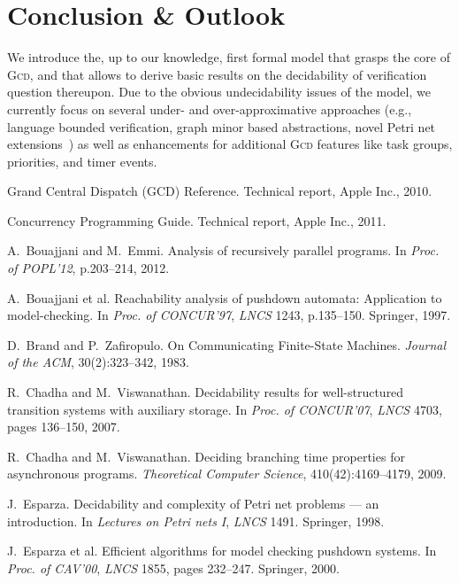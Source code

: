 \documentclass[runningheads,oribibl,]{article}
\renewcommand{\gcd}{\textsc{Gcd}\xspace}
\begin{document}
\section{Conclusion \& Outlook}
We introduce the, up to our knowledge, first formal model that grasps
the core of \gcd, and that allows to derive basic results on the
decidability of verification question thereupon. Due to the obvious
undecidability issues of the model, we currently focus on several
under- and over-approximative approaches (e.g., language bounded
verification, graph minor based abstractions, novel Petri net
extensions~\cite{geeraerts-g-2012--a}) as well as enhancements for
additional \gcd features like task groups, priorities, and timer
events.


\newcommand{\nb}{}
\begin{thebibliography}{10}

{G}rand {C}entral {D}ispatch ({GCD}) {R}eference.
\nb Technical report, Apple Inc., 2010.

{C}oncurrency {P}rogramming {G}uide.
\nb Technical report, Apple Inc., 2011.

A.~Bouajjani and M.~Emmi.
\nb Analysis of recursively parallel programs.
\nb In {\em Proc. of POPL'12}, p.203--214, 2012.

A.~Bouajjani et al.
\nb Reachability analysis of pushdown automata: Application to
  model-checking.
\nb In {\em Proc. of CONCUR'97}, {\em {LNCS}} 1243, p.135--150. Springer,
  1997.

D.~Brand and P.~Zafiropulo.
\nb {O}n {C}ommunicating {F}inite-{S}tate {M}achines.
\nb {\em Journal of the ACM}, 30(2):323--342, 1983.

R.~Chadha and M.~Viswanathan.
\nb Decidability results for well-structured transition systems with
  auxiliary storage.
\nb In {\em Proc. of CONCUR'07}, {\em {LNCS}} 4703, pages
  136--150, 2007.

R.~Chadha and M.~Viswanathan.
\nb Deciding branching time properties for asynchronous programs.
\nb {\em Theoretical Computer Science}, 410(42):4169--4179, 2009.

J.~Esparza.
\nb Decidability and complexity of {P}etri net problems {---} an
  introduction.
\nb In {\em Lectures on Petri nets I}, {\em {LNCS}} 1491.
  Springer, 1998.

J.~Esparza et al.
\nb Efficient algorithms for model checking pushdown systems.
\nb In {\em Proc. of CAV'00}, {\em {LNCS}} 1855, pages
  232--247. Springer, 2000.


\end{thebibliography}
\end{document}
